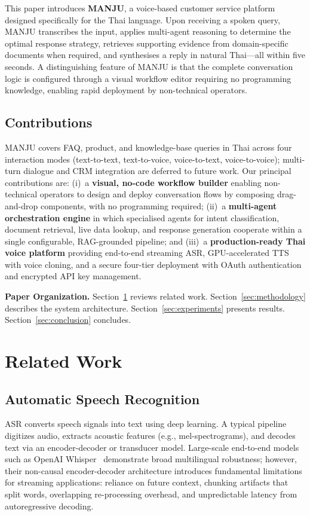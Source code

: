 \documentclass[10pt, a4paper, twocolumn]{article}
\begin{document}
This paper introduces \textbf{MANJU}, a voice-based customer service
platform designed specifically for the Thai language.
Upon receiving a spoken query, MANJU transcribes the input, applies
multi-agent reasoning to determine the optimal response strategy, retrieves
supporting evidence from domain-specific documents when required, and
synthesises a reply in natural Thai---all within five seconds.
A distinguishing feature of MANJU is that the complete conversation logic
is configured through a visual workflow editor requiring no programming
knowledge, enabling rapid deployment by non-technical operators.

\subsection{Contributions}
MANJU covers FAQ, product, and knowledge-base queries in Thai across four interaction modes (text-to-text, text-to-voice, voice-to-text, voice-to-voice); multi-turn dialogue and CRM integration are deferred to future work.
Our principal contributions are: (i)~a \textbf{visual, no-code workflow builder} enabling non-technical operators to design and deploy conversation flows by composing drag-and-drop components, with no programming required; (ii)~a \textbf{multi-agent orchestration engine} in which specialised agents for intent classification, document retrieval, live data lookup, and response generation cooperate within a single configurable, RAG-grounded pipeline; and (iii)~a \textbf{production-ready Thai voice platform} providing end-to-end streaming ASR, GPU-accelerated TTS with voice cloning, and a secure four-tier deployment with OAuth authentication and encrypted API key management.

\noindent\textbf{Paper Organization.}
Section~\ref{sec:related} reviews related work.
Section~\ref{sec:methodology} describes the system architecture.
Section~\ref{sec:experiments} presents results.
Section~\ref{sec:conclusion} concludes.

\section{Related Work}
\label{sec:related}

\subsection{Automatic Speech Recognition}
ASR converts speech signals into text using deep learning.
A typical pipeline digitizes audio, extracts acoustic features (e.g., mel-spectrograms), and decodes text via an encoder-decoder or transducer model.
Large-scale end-to-end models such as OpenAI Whisper~\cite{radford2022whisper} demonstrate broad multilingual robustness; however, their non-causal encoder-decoder architecture introduces fundamental limitations for streaming applications: reliance on future context, chunking artifacts that split words, overlapping re-processing overhead, and unpredictable latency from autoregressive decoding.
\end{document}

